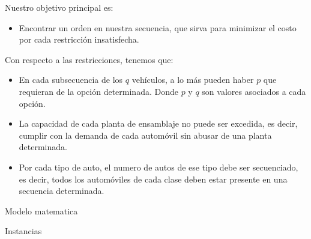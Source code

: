 Nuestro objetivo principal es:
\begin{itemize}
    \item Encontrar un orden en nuestra secuencia, que sirva para minimizar el costo por cada restricción insatisfecha.
\end{itemize}

Con respecto a las restricciones, tenemos que:
\begin{itemize}
    \item En cada subsecuencia de los $q$ vehículos, a lo más pueden haber $p$ que requieran de la opción determinada.
        Donde $p$ y $q$ son valores asociados a cada opción.
    \item La capacidad de cada planta de ensamblaje no puede ser excedida, es decir, cumplir con la demanda de cada automóvil
        sin abusar de una planta determinada.
    \item Por cada tipo de auto, el numero de autos de ese tipo debe ser secuenciado, es decir, todos los automóviles de cada clase
        deben estar presente en una secuencia determinada.
\end{itemize}

\vspace{4cm}

Modelo matematica

Instancias
